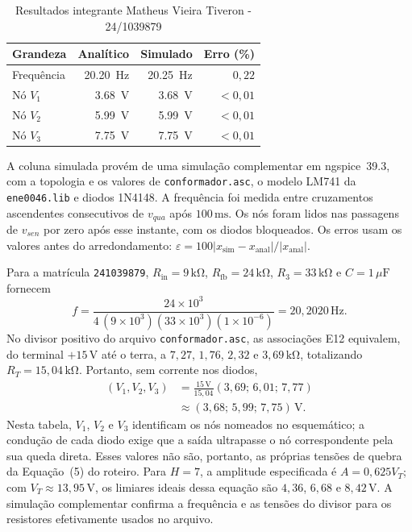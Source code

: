 \documentclass[11pt,a4paper]{article}
\begin{document}
\begin{table}[H]
\centering
\caption{Resultados integrante Matheus Vieira Tiveron - 24/1039879}
\label{tab:resultados-matheus-241039879}
\begin{tabular}{@{}lrrr@{}}
\toprule
\textbf{Grandeza} & \textbf{Analítico} & \textbf{Simulado} & \textbf{Erro (\%)} \\
\midrule
Frequência & \SI{20.20}{\hertz} & \SI{20.25}{\hertz} & $0{,}22$ \\
Nó $V_1$ & \SI{3.68}{\volt} & \SI{3.68}{\volt} & $<0{,}01$ \\
Nó $V_2$ & \SI{5.99}{\volt} & \SI{5.99}{\volt} & $<0{,}01$ \\
Nó $V_3$ & \SI{7.75}{\volt} & \SI{7.75}{\volt} & $<0{,}01$ \\
\bottomrule
\end{tabular}

\vspace{4pt}
\begin{minipage}{0.97\linewidth}
\footnotesize
A coluna simulada provém de uma simulação complementar em ngspice~39.3,
com a topologia e os valores de \texttt{conformador.asc}, o modelo LM741
da \texttt{ene0046.lib} e diodos 1N4148. A frequência foi medida entre
cruzamentos ascendentes consecutivos de $v_{qua}$ após $100\,\mathrm{ms}$.
Os nós foram lidos nas passagens de $v_{sen}$ por zero após esse instante,
com os diodos bloqueados. Os erros usam os valores antes do arredondamento:
$\varepsilon=100|x_{\mathrm{sim}}-x_{\mathrm{anal}}|/|x_{\mathrm{anal}}|$.
\end{minipage}
\end{table}

Para a matrícula \texttt{241039879}, $R_{\mathrm{in}}=9\,\mathrm{k\Omega}$,
$R_{\mathrm{fb}}=24\,\mathrm{k\Omega}$, $R_3=33\,\mathrm{k\Omega}$ e
$C=1\,\mu\mathrm{F}$ fornecem
\[
f=\frac{24\times10^3}
{4\,(9\times10^3)(33\times10^3)(1\times10^{-6})}
=20{,}2020\,\mathrm{Hz}.
\]
No divisor positivo do arquivo \texttt{conformador.asc}, as associações
E12 equivalem, do terminal $+15\,\mathrm{V}$ até o terra, a
$7{,}27$, $1{,}76$, $2{,}32$ e $3{,}69\,\mathrm{k\Omega}$, totalizando
$R_T=15{,}04\,\mathrm{k\Omega}$. Portanto, sem corrente nos diodos,
\[
\begin{aligned}
(V_1,V_2,V_3)&=\frac{15\,\mathrm{V}}{15{,}04}
(3{,}69;\,6{,}01;\,7{,}77)\\
&\approx(3{,}68;\,5{,}99;\,7{,}75)\,\mathrm{V}.
\end{aligned}
\]
Nesta tabela, $V_1$, $V_2$ e $V_3$ identificam os nós nomeados no
esquemático; a condução de cada diodo exige que a saída ultrapasse o nó
correspondente pela sua queda direta. Esses valores não são, portanto,
as próprias tensões de quebra da Equação~(5) do roteiro. Para $H=7$,
a amplitude especificada é $A=0{,}625V_T$; com
$V_T\approx13{,}95\,\mathrm{V}$, os limiares ideais dessa equação são
$4{,}36$, $6{,}68$ e $8{,}42\,\mathrm{V}$. A simulação complementar
confirma a frequência e as tensões do divisor para os resistores
efetivamente usados no arquivo.
\end{document}
